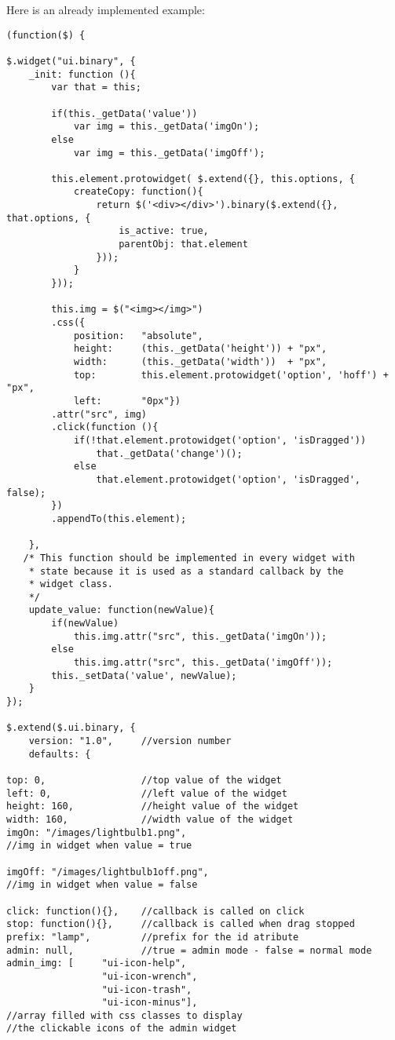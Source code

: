 Here is an already implemented example:
\begin{lstlisting}[caption=binaray widget: ui.binary.js ,label=lst:h2h:binarywidget]
(function($) {

$.widget("ui.binary", {
	_init: function (){
		var that = this;

		if(this._getData('value'))
			var img = this._getData('imgOn');
		else
			var img = this._getData('imgOff');

		this.element.protowidget( $.extend({}, this.options, {
			createCopy: function(){
				return $('<div></div>').binary($.extend({}, that.options, {
					is_active: true,
					parentObj: that.element
				}));
			}
		}));
		
		this.img = $("<img></img>")
		.css({
			position: 	"absolute",
			height: 	(this._getData('height')) + "px",
			width:		(this._getData('width'))  + "px",
			top: 		this.element.protowidget('option', 'hoff') + "px",
			left: 		"0px"})
		.attr("src", img)
		.click(function (){
			if(!that.element.protowidget('option', 'isDragged'))
				that._getData('change')();
			else
				that.element.protowidget('option', 'isDragged', false);
		})
		.appendTo(this.element);
		
	},
   /* This function should be implemented in every widget with
    * state because it is used as a standard callback by the
    * widget class.
    */
	update_value: function(newValue){
		if(newValue)
			this.img.attr("src", this._getData('imgOn'));
		else
			this.img.attr("src", this._getData('imgOff'));
		this._setData('value', newValue);
	}
});

$.extend($.ui.binary, {
    version: "1.0",     //version number
    defaults: {

top: 0,                 //top value of the widget
left: 0,                //left value of the widget
height: 160,            //height value of the widget
width: 160,	            //width value of the widget
imgOn: "/images/lightbulb1.png",
//img in widget when value = true

imgOff: "/images/lightbulb1off.png",
//img in widget when value = false

click: function(){},    //callback is called on click
stop: function(){},     //callback is called when drag stopped
prefix: "lamp",         //prefix for the id atribute
admin: null,            //true = admin mode - false = normal mode
admin_img: [     "ui-icon-help",
                 "ui-icon-wrench",	
                 "ui-icon-trash",	
                 "ui-icon-minus"],
//array filled with css classes to display
//the clickable icons of the admin widget


\end{lstlisting}
